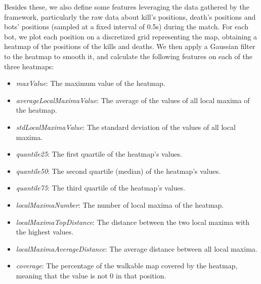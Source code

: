 Besides these, we also define some features leveraging the data gathered by the framework, particularly the raw data about kill's positions, death's positions and bots' positions (sampled at a fixed interval of 0.5s) during the match. For each bot, we plot each position on a discretized grid representing the map, obtaining a heatmap of the positions of the kills and deaths. We then apply a Gaussian filter to the heatmap to smooth it, and calculate the following features on each of the three heatmaps:

\begin{itemize}
    \item \textit{maxValue}: The maximum value of the heatmap.
    \item \textit{averageLocalMaximaValue}: The average of the values of all local maxima of the heatmap.
    \item \textit{stdLocalMaximaValue}: The standard deviation of the values of all local maxima.
    \item \textit{quantile25}: The first quartile of the heatmap's values.
    \item \textit{quantile50}: The second quartile (median) of the heatmap's values.
    \item \textit{quantile75}: The third quartile of the heatmap's values.
    \item \textit{localMaximaNumber}: The number of local maxima of the heatmap.
    \item \textit{localMaximaTopDistance}: The distance between the two local maxima with the highest values.
    \item \textit{localMaximaAverageDistance}: The average distance between all local maxima.
    \item \textit{coverage}: The percentage of the walkable map covered by the heatmap, meaning that the value is not 0 in that position.
\end{itemize}

